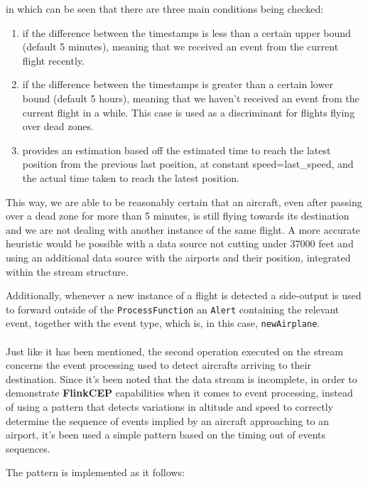 in which can be seen that there are three main conditions being checked:
\begin{enumerate}
    \item if the difference between the timestamps is less than a certain upper bound (default 5 minutes), meaning that we received an event from the current flight recently.
    \item if the difference between the timestamps is greater than a certain lower bound (default 5 hours), meaning that we haven't received an event from the current flight in a while. This case is used as a discriminant for flights flying over dead zones.
    \item provides an estimation based off the estimated time to reach the latest position from the previous last position, at constant speed=last\_speed, and the actual time taken to reach the latest position.
\end{enumerate}

This way, we are able to be reasonably certain that an aircraft, even after passing over a dead zone for more than 5 minutes, is still flying towards its destination and we are not dealing with another instance of the same flight. A more accurate heuristic would be possible with a data source not cutting under 37000 feet and using an additional data source with the airports and their position, integrated within the stream structure.

Additionally, whenever a new instance of a flight is detected a side-output is used to forward outside of the \texttt{ProcessFunction} an \texttt{Alert} containing the relevant event, together with the event type, which is, in this case, \texttt{newAirplane}.
\\\\
Just like it has been mentioned, the second operation executed on the stream concerns the event processing used to detect aircrafts arriving to their destination. Since it's been noted that the data stream is incomplete, in order to demonstrate \textbf{FlinkCEP} capabilities when it comes to event processing, instead of using a pattern that detects variations in altitude and speed to correctly determine the sequence of events implied by an aircraft approaching to an airport, it's been used a simple pattern based on the timing out of events sequences.

The pattern is implemented as it follows:

